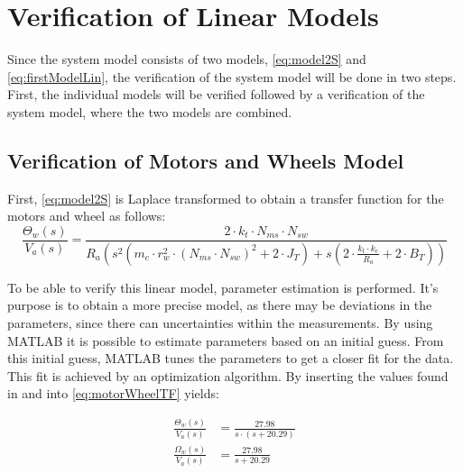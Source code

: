 \section{Verification of Linear Models}
Since the system model consists of two models, \autoref{eq:model2S} and \ref{eq:firstModelLin}, the verification of the system model will be done in two steps. First, the individual models will be verified followed by a verification of the system model, where the two models are combined.
\subsection{Verification of Motors and Wheels Model}
First, \autoref{eq:model2S} is Laplace transformed to obtain a transfer function for the motors and wheel as follows: 
\begin{equation}
\frac{\Theta_w(s)}{V_a(s)} = \frac{2 \cdot k_t\cdot N_{ms}\cdot N_{sw}}{R_a(s^2(m_c \cdot r_w^2\cdot (N_{ms}\cdot N_{sw})^2 + 2 \cdot J_T) + s(2 \cdot\frac{k_t \cdot k_e}{R_a}+ 2\cdot B_T))}\label{eq:motorWheelTF}
\end{equation}

To be able to verify this linear model, parameter estimation is performed. It's purpose is to obtain a more precise model, as there may be deviations in the parameters, since there can uncertainties within the measurements. By using MATLAB it is possible to estimate parameters based on an initial guess. From this initial guess, MATLAB tunes the parameters to get a closer fit for the data. This fit is achieved by an optimization algorithm. By inserting the values found in  and  into \autoref{eq:motorWheelTF} yields:


\begin{align}
\frac{\Theta_w(s)}{V_a(s)}&=\frac{27.98}{s\cdot(s+20.29)}\\
\frac{\Omega_w(s)}{V_a(s)}&=\frac{27.98}{s+20.29}\label{eq:thomasA1}
\end{align}

